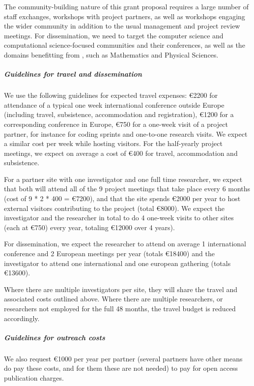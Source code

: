 The community-building nature of this grant proposal requires a large
number of staff exchanges, workshops with project partners, as well as
workshops engaging the wider community in addition to the usual
management and project review meetings. For dissemination, we need to
target the computer science and computational science-focused
communities and their conferences, as well as the domains benefitting
from \TheProject, such as Mathematics and Physical Sciences.

\subparagraph{Guidelines for travel and dissemination}
\label{sect:budget-details-travel}

We use the following guidelines for expected travel expenses:
\euro{2200} for attendance of a typical one week international
conference outside Europe (including travel, subsistence,
accommodation and registration), \euro{1200} for a corresponding
conference in Europe, \euro{750} for a one-week visit of a  project
partner, for instance for coding sprints and one-to-one 
research visits. We expect a similar cost per week while hosting
visitors. For the half-yearly project meetings, we expect on average a
cost of \euro{400} for travel, accommodation and subsistence.

For a partner site with one investigator and one full time researcher,
we expect that both will attend all of the 9 project meetings that take
place every 6 months (cost of 9 * 2 * 400 =
\euro{7200}), and that the site spends \euro{2000} per year to host
external visitors contributing to the project (total \euro{8000}). We
expect the investigator and the researcher in total to do 4 one-week visits
to other sites (each at \euro{750}) every year, totaling \euro{12000} over 4 years).

For dissemination, we expect the researcher to attend on average 1
international conference and 2 European meetings per year (totals
\euro{18400}) and the investigator to attend one international and one
european gathering (totals \euro{13600}).

Where there are multiple investigators per site, they will share the
travel and associated costs outlined above. Where there are multiple
researchers, or researchers not employed for the full 48 months, the
travel budget is reduced accordingly.

\subparagraph{Guidelines for outreach costs}
\label{sect:budget-outreach-publication-charges}
We also request \euro{1000} per year per partner (several partners
have other means do pay these costs, and for them these are not needed) 
to pay for open access publication charges.

